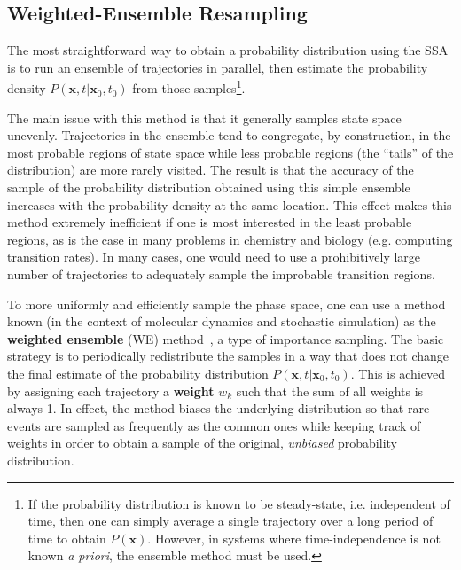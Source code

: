 \documentclass[english,letterpaper,12pt]{article}
\newcommand{\defkeywd}[1]{\textbf{#1}}
\renewcommand{\vec}[1]{\ensuremath{\mathbf{#1}}}
\begin{document}
\begin{doublespacing}

\subsection{Weighted-Ensemble Resampling} %
\label{sub:we-resampling-intro}

The most straightforward way to obtain a probability distribution using the SSA is to run an ensemble of trajectories in parallel, then estimate the probability density $P(\vec{x}, t | \vec{x}_0, t_0)$ from those samples\footnote{If the probability distribution is known to be steady-state, i.e. independent of time, then one can simply average a single trajectory over a long period of time to obtain $P(\vec{x})$. However, in systems where time-independence is not known \textit{a priori}, the ensemble method must be used.}.

The main issue with this method is that it generally samples state space unevenly. Trajectories in the ensemble tend to congregate, by construction, in the most probable regions of state space while less probable regions (the ``tails'' of the distribution) are more rarely visited. The result is that the accuracy of the sample of the probability distribution obtained using this simple ensemble increases with the probability density at the same location. This effect makes this method extremely inefficient if one is most interested in the least probable regions, as is the case in many problems in chemistry and biology (e.g. computing transition rates).
In many cases,  one would need to use a prohibitively large number of trajectories to adequately sample the improbable transition regions.

To more uniformly and efficiently sample the phase space, one can use a method known (in the context of molecular dynamics and stochastic simulation) as the \defkeywd{weighted ensemble} (WE) method~\cite{we-orig}, a type of importance sampling. The basic strategy is to periodically redistribute the samples in a way that does not change the final estimate of the probability distribution $P(\vec{x}, t | \vec{x}_0, t_0)$. This is achieved by assigning each trajectory a \defkeywd{weight} $w_k$ such that the sum of all weights is always 1. In effect, the method biases the underlying distribution so that rare events are sampled as frequently as the common ones while keeping track of weights in order to obtain a sample of the original, \emph{unbiased} probability distribution.


\end{doublespacing}
\end{document}
